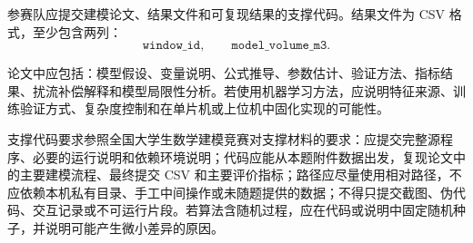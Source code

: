 \documentclass[UTF8,a4paper,11pt]{ctexart}
\begin{document}
参赛队应提交建模论文、结果文件和可复现结果的支撑代码。结果文件为 CSV 格式，至少包含两列：
\[
\texttt{window\_id},\qquad \texttt{model\_volume\_m3}.
\]

论文中应包括：模型假设、变量说明、公式推导、参数估计、验证方法、指标结果、扰流补偿解释和模型局限性分析。若使用机器学习方法，应说明特征来源、训练验证方式、复杂度控制和在单片机或上位机中固化实现的可能性。

支撑代码要求参照全国大学生数学建模竞赛对支撑材料的要求：应提交完整源程序、必要的运行说明和依赖环境说明；代码应能从本题附件数据出发，复现论文中的主要建模流程、最终提交 CSV 和主要评价指标；路径应尽量使用相对路径，不应依赖本机私有目录、手工中间操作或未随题提供的数据；不得只提交截图、伪代码、交互记录或不可运行片段。若算法含随机过程，应在代码或说明中固定随机种子，并说明可能产生微小差异的原因。
\end{document}
